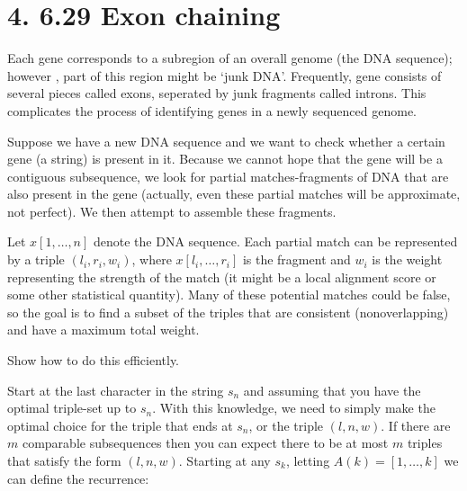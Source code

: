 \documentclass[11pt]{article}
\begin{document}
\label{pg:end-of-p3}

%

\newpage

\section*{4. 6.29 Exon chaining}

Each gene corresponds to a subregion of an overall genome (the DNA sequence); however
, part of this region might be `junk DNA'. Frequently, gene consists of 
several pieces called exons, seperated by junk fragments called introns. This complicates
the process of identifying genes in a newly sequenced genome.

Suppose we have a new DNA sequence and we want to check whether a certain gene (a string) 
is present in it. Because we cannot hope that the gene will be a contiguous subsequence,
we look for partial matches-fragments of DNA that are also present in the gene (actually, 
even these partial matches will be approximate, not perfect). We then attempt to assemble 
these fragments. 

Let $x[1,\ldots,n]$ denote the DNA sequence. Each partial match can be represented by a triple 
$(l_i,r_i,w_i)$, where $x[l_i,\ldots,r_i]$ is the fragment and $w_i$ is the weight representing 
the strength of the match (it might be a local alignment score or some other statistical 
quantity). Many of these potential matches could be false, so the goal is to find a subset
of the triples that are consistent (nonoverlapping) and have a maximum total weight.

Show how to do this efficiently.

Start at the last character in the string $s_n$ and assuming that you have the optimal triple-set up
to $s_n$. With this knowledge, we need to simply make the optimal choice for the triple that ends at
$s_n$, or the triple $(l,n,w)$. If there are $m$ comparable subsequences then you can expect there to be
at most $m$ triples that satisfy the form $(l,n,w)$. Starting at any $s_k$, letting $A(k)  = [1,\ldots,k]$ we can define the recurrence:
\end{document}
